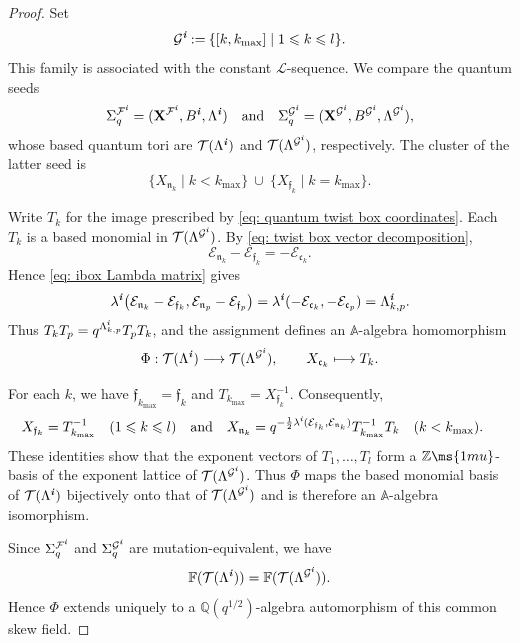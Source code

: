 \documentclass[12pt, leqno]{amsart}
\numberwithin{equation}{section}
\theoremstyle{plain}
\theoremstyle{definition}
\renewcommand{\le}{\leqslant}
\newcommand{\seteq}{\mathbin{:=}}
\newcommand{\Q}{\mathbb{Q}}
\newcommand{\Z}{\mathbb{Z}\ms{1mu}}
\newcommand{\ii}{ \textbf{\textit{i}}}
\newcommand{\frakc}{\mathfrak{c}}
\newcommand{\frakf}{\mathfrak{f}}
\newcommand{\frakn}{\mathfrak{n}}
\newcommand{\bbA}{\mathbb{A}}
\newcommand{\bbF}{\mathbb{F}}
\newcommand{\bfX}{\mathbf{X}}
\newcommand{\calE}{\mathcal{E}}
\newcommand{\calF}{\mathcal{F}}
\newcommand{\calG}{\mathcal{G}}
\newcommand{\calL}{\mathcal{L}}
\newcommand{\calT}{\mathcal{T}}
\newcommand{\qtq}[1][{and}]{\quad\text{{#1}}\quad}
\begin{document}
\begin{proof}
Set
\[
\calG^\ii\seteq\{[k,k_{\max}]\mid1\le k\le l\}.
\]
This family is associated with the constant $\calL$-sequence.
We compare the quantum seeds
\begin{align*}
\Sigma_q^{\calF^\ii}
=(\bfX^{\calF^\ii},B^\ii,\Lambda^\ii) \qtq 
\Sigma_q^{\calG^\ii}
=(\bfX^{\calG^\ii},B^{\calG^\ii},\Lambda^{\calG^\ii}),
\end{align*}
whose based quantum tori are
$\calT(\Lambda^\ii)$ and $\calT(\Lambda^{\calG^\ii})$,
respectively.
The cluster of the latter seed is
\[
\{X_{\frakn_k}\mid k<k_{\max}\}
\ \cup\
\{X_{\frakf_k}\mid k=k_{\max}\}.
\]

Write $T_k$ for the image prescribed by
\eqref{eq: quantum twist box coordinates}.
Each $T_k$ is a based monomial in
$\calT(\Lambda^{\calG^\ii})$.
By \eqref{eq: twist box vector decomposition},
\[
\calE_{\frakn_k}-\calE_{\frakf_k}
=-\calE_{\frakc_k}.
\]
Hence \eqref{eq: ibox Lambda matrix} gives
\begin{align*}
\lambda^\ii \bigl(\calE_{\frakn_k}-\calE_{\frakf_k}, \calE_{\frakn_p}-\calE_{\frakf_p}\bigr) 
= \lambda^\ii(-\calE_{\frakc_k},-\calE_{\frakc_p}) =\Lambda^\ii_{k,p}.
\end{align*}
Thus $T_kT_p=q^{\Lambda^\ii_{k,p}}T_pT_k$, and the assignment
defines an $\bbA$-algebra homomorphism
\[
\Phi:\calT(\Lambda^\ii)\longrightarrow
\calT(\Lambda^{\calG^\ii}),
\qquad
X_{\frakc_k}\longmapsto T_k.
\]

For each $k$, we have
$\frakf_{k_{\max}}=\frakf_k$ and
$T_{k_{\max}}=X_{\frakf_k}^{-1}$.
Consequently,
\begin{align*}
X_{\frakf_k}
&=T_{k_{\max}}^{-1}
\quad (1\le k\le l) \qtq 
X_{\frakn_k}
=
q^{-\frac12\lambda^\ii(\calE_{\frakf_k},\calE_{\frakn_k})}
T_{k_{\max}}^{-1}T_k
\quad (k<k_{\max}).
\end{align*}
These identities show that the exponent vectors of
$T_1,\ldots,T_l$ form a $\Z$-basis of the exponent lattice of
$\calT(\Lambda^{\calG^\ii})$.
Thus $\Phi$ maps the based monomial basis of $\calT(\Lambda^\ii)$
bijectively onto that of $\calT(\Lambda^{\calG^\ii})$ and is
therefore an $\bbA$-algebra isomorphism.

Since $\Sigma_q^{\calF^\ii}$ and $\Sigma_q^{\calG^\ii}$ are
mutation-equivalent, we have
\[
\bbF(\calT(\Lambda^\ii))
=
\bbF(\calT(\Lambda^{\calG^\ii})).
\]
Hence $\Phi$ extends uniquely to a $\Q(q^{1/2})$-algebra
automorphism of this common skew field.
\end{proof}
\end{document}
